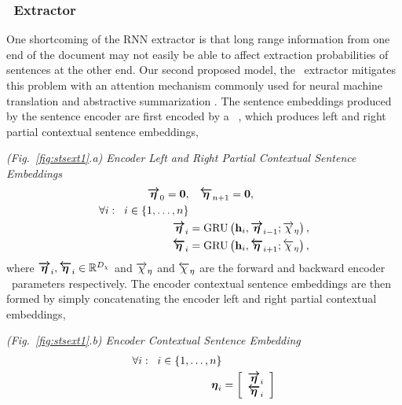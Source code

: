 \subsubsection{\sts~Extractor} 

One shortcoming of the RNN extractor is that long range
information from one end of the document may not easily be able to affect 
extraction probabilities of sentences at the other end. 
Our second proposed model, the \sts~extractor mitigates this problem with an 
attention 
mechanism commonly
used for neural machine translation \citep{bahdanau2014neural} and 
abstractive summarization \citep{see2017get}. 
The sentence embeddings produced by the sentence encoder are first
encoded by a \bidirectional~\gru, which produces left and right
partial contextual sentence embeddings, 



 \vspace{10pt}   \noindent \textit{(Fig.~\ref{fig:stsext1}.a) Encoder Left and Right Partial Contextual Sentence Embeddings}
\begin{align}
        \boldsymbol{\overrightarrow{\eta}}_0  = \mathbf{0}, & \quad 
        \boldsymbol{\overleftarrow{\eta}}_{n + 1}  = \mathbf{0}, \\
\forall i : \;\; i \in \{1,\ldots,n\}& \nonumber \\
\boldsymbol{\overrightarrow{\eta}}_i & = \operatorname{GRU}\left(
            \mathbf{h}_i, \boldsymbol{\overrightarrow{\eta}}_{i-1}; 
            {\overrightarrow{\chi}_\eta}\right), \\
\boldsymbol{\overleftarrow{\eta}}_i &= \operatorname{GRU}\left(
            \mathbf{h}_i, \boldsymbol{\overleftarrow{\eta}}_{i+1}; 
            {\overleftarrow{\chi}_\eta}\right),
\end{align}
where $\boldsymbol{\overrightarrow{\eta}}_i,\boldsymbol{\overleftarrow{\eta}}_i \in \mathbb{R}^{{D_\chi}}$ and 
${\overrightarrow{\chi}_\eta}$ and ${\overleftarrow{\chi}_\eta}$ are the forward and backward encoder \gru~parameters respectively. The encoder contextual sentence embeddings
are then formed by simply concatenating the encoder left and right 
partial contextual embeddings,

\vspace{10pt} \noindent \textit{(Fig.~\ref{fig:stsext1}.b) Encoder Contextual Sentence Embedding}
\begin{align}
\forall i : \;\; i \in \{1,\ldots,n\} & \nonumber \\
        \boldsymbol{\eta}_i & = \left[\begin{array}{c}
            \boldsymbol{\overrightarrow{\eta}}_i\\ 
            \boldsymbol{\overleftarrow{\eta}}_i\end{array}\right] 
\end{align}




